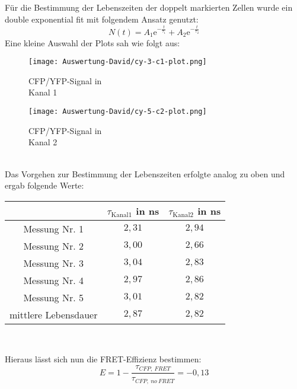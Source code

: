 \newpage
Für die Bestimmung der Lebenszeiten der doppelt markierten Zellen wurde ein double exponential fit mit folgendem Ansatz genutzt:\\
\begin{equation}
N(t) = A_{1} \mathrm{e}^{-\frac{t}{\tau_1}}+A_{2} \mathrm{e}^{-\frac{t}{\tau_2}}
\end{equation}
Eine kleine Auswahl der Plots sah wie folgt aus:\\
\begin{figure}[h]
	\begin{minipage}{.4\linewidth} %
		\texttt{[image: Auswertung-David/cy-3-c1-plot.png]}
		\caption{CFP/YFP-Signal in \\Kanal 1}
	\end{minipage}
	\hspace{.1\linewidth}%
	\begin{minipage}{.4\linewidth} %
		\texttt{[image: Auswertung-David/cy-5-c2-plot.png]}
		\caption{CFP/YFP-Signal in \\Kanal 2}
	\end{minipage}
\end{figure}\\
Das Vorgehen zur Bestimmung der Lebenszeiten erfolgte analog zu oben und ergab folgende Werte:\\
\begin{center} 
	\begin{tabular}[c]{ccc}
		\hline
		& $\tau_{\mathrm{Kanal 1}}$ in ns & $\tau_{\mathrm{Kanal 2}}$ in ns \\
		\hline
		Messung Nr. 1 & $2,31$ & $2,94$ \\
		Messung Nr. 2 & $3,00$ & $2,66$ \\
		Messung Nr. 3 & $3,04$ & $2,83$ \\
		Messung Nr. 4 & $2,97$ & $2,86$ \\
		Messung Nr. 5 & $3,01$ & $2,82$ \\
		\hline
		mittlere Lebensdauer & $2,87$ & $2,82$\\
		\hline
	\end{tabular}\\
\end{center}
Hieraus lässt sich nun die FRET-Effizienz bestimmen:\\
\begin{equation}
E = 1-\frac{\tau_{CFP,\:FRET}}{\tau_{CFP,\:no\:FRET}}=-0,13
\end{equation}
